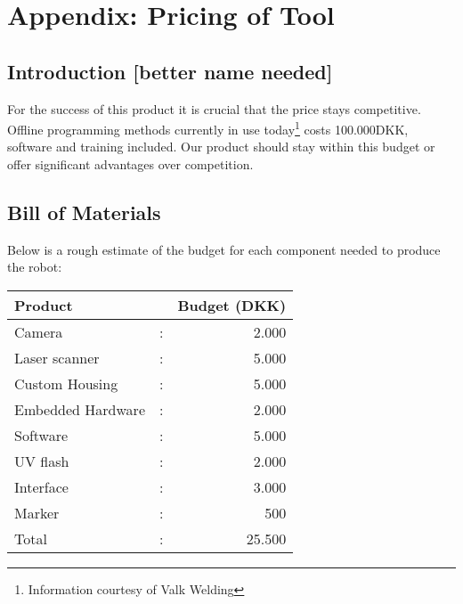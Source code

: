 
\section{Appendix: Pricing of Tool}
\subsection{Introduction [better name needed]}
For the success of this product it is crucial that the price stays competitive. Offline programming methods currently in use today\footnote{Information courtesy of Valk Welding} costs 100.000DKK, software and training included. Our product should stay within this budget or offer significant advantages over competition.
\subsection{Bill of Materials}
Below is a rough estimate of the budget for each component needed to produce the robot:
\begin{center}
\begin{tabular}{l c r}
Product            & & Budget (DKK)\\
\hline
Camera & : & 2.000  \\
Laser scanner& : & 5.000 \\
Custom Housing& : & 5.000\\
Embedded Hardware& : & 2.000\\
Software& : & 5.000\\
UV flash& : & 2.000\\
Interface& : & 3.000\\
Marker& : & 500\\[0.2cm]
\hline
Total& : & 25.500\\ 
\end{tabular}
\end{center}
